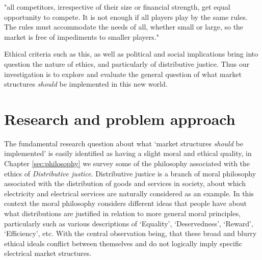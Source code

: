 "all competitors, irrespective of their size or financial strength, get equal opportunity to compete. It is not enough if all players play by the same rules. The rules must accommodate the needs of all, whether small or large, so the market is free of impediments to smaller players." \cite{australianenergymarketoperatorlimited2018}

Ethical criteria such as this, as well as political and social implications bring into question the nature of ethics, and particularly of distributive justice. 
Thus our investigation is to explore and evaluate the general question of what market structures \textit{should} be implemented in this new world.

\section{Research and problem approach}

The fundamental research question about what `market structures \textit{should} be implemented' is easily identified as having a slight moral and ethical quality, in Chapter \ref{sec:philosophy} we survey some of the philosophy associated with the ethics of \textit{Distributive justice}.
Distributive justice is a branch of moral philosophy associated with the distribution of goods and services in society, about which electricity and electrical services are naturally considered as an example.
In this context the moral philosophy considers different ideas that people have about what distributions are justified in relation to more general moral principles, particularly such as various descriptions of `Equality', `Deservedness', `Reward', `Efficiency', etc. 
With the central observation being, that these broad and blurry ethical ideals conflict between themselves and do not logically imply specific electrical market structures.


